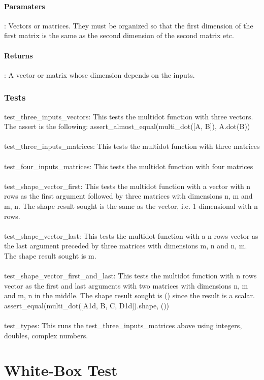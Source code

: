 \documentclass[a4paper,11pt]{article}
\begin{document}
\paragraph{Paramaters}: Vectors or matrices. They must be organized so that the first dimension of the first matrix is the same as the second dimension of the second matrix etc. 
\paragraph{Returns}: A vector or matrix whose dimension depends on the inputs. 
\subsubsection{Tests}
test\_three\_inputs\_vectors: This tests the multidot function with three vectors. The assert is the following: assert\_almost\_equal(multi\_dot([A, B]), A.dot(B))\\
\\
test\_three\_inputs\_matrices: This tests the multidot function with three matrices\\
\\
test\_four\_inputs\_matrices: This tests the multidot function with four matrices\\
\\
test\_shape\_vector\_first: This tests the multidot function with a vector with n rows as the first argument followed by three matrices with dimensions n, m and m, n. The shape result sought is the same as the vector, i.e. 1 dimensional with n rows. \\
\\
test\_shape\_vector\_last: This tests the multidot function with a n rows vector as the last argument preceded by three matrices with dimensions m, n and n, m. The shape result sought is m. \\
\\
test\_shape\_vector\_first\_and\_last: This tests the multidot function with n rows vector as the first and last arguments with two matrices with dimensions n, m and m, n in the middle. The shape result sought is () since the result is a scalar. assert\_equal(multi\_dot([A1d, B, C, D1d]).shape, ())\\
\\
test\_types: This runs the test\_three\_inputs\_matrices above using integers, doubles, complex numbers. 


\section{White-Box Test}
\end{document}
